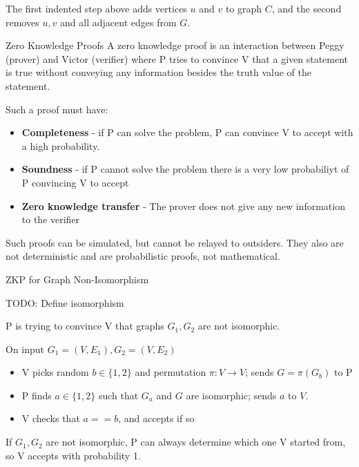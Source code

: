 \documentclass[2pt]{scrartcl}
\makeatletter
\renewcommand{\section}{\@startsection{section}{1}{0mm}
  {-1ex plus -.5ex minus -.2ex}
  {0.5ex plus .2ex}
{\normalfont\large\bfseries}}
\renewcommand{\subsection}{\@startsection{subsection}{2}{0mm}
  {-1explus -.5ex minus -.2ex}
  {0.5ex plus .2ex}
{\normalfont\normalsize\bfseries}}
\makeatother
\begin{document}
\begin{multicols}{6}
  The first indented step above adds vertices $u$ and $v$ to graph $C$, and the second removes $u, v$ and all adjacent edges from $G$.

  \section{Zero Knowledge Proofs}
  A zero knowledge proof is an interaction between Peggy (prover) and Victor (verifier) where P tries to convince V that a given statement is true without conveying any information besides the truth value of the statement.

  Such a proof must have:

  \begin{itemize}
    \item {\bf Completeness} - if P can solve the problem, P can convince V to accept with a high probability.
    \item {\bf Soundness} - if P cannot solve the problem there is a very low probabiliyt of P convincing V to accept
    \item {\bf Zero knowledge transfer} - The prover does not give any new information to the verifier
  \end{itemize}

  Such proofs can be simulated, but cannot be relayed to outsiders. They also are not deterministic and are probabilistic proofs, not mathematical.

  \subsection{ZKP for Graph Non-Isomorphism}

  TODO: Define isomorphism

  P is trying to convince V that graphs $G_1, G_2$ are not isomorphic.

  On input $G_1 = (V, E_1), G_2 = (V, E_2)$ 
  \begin{itemize}
    \item V picks random $b \in \{1, 2\}$ and permutation $\pi: V \rightarrow V$; sends $G = \pi(G_b)$ to P
    \item P finds $a \in \{1, 2\}$ such that $G_a$ and $G$ are isomorphic; sends $a$ to $V$.
    \item V checks that $a == b$, and accepts if so
  \end{itemize}

  If $G_1, G_2$ are not isomorphic, P can always determine which one V started from, so V accepts with probability 1.


\end{multicols}
\end{document}

